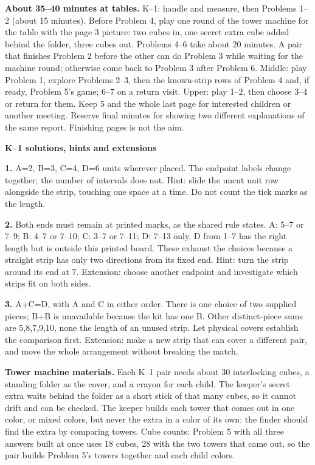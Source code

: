 \documentclass[letterpaper,11pt]{article}
\newcommand{\topic}[1]{\par\medskip\textbf{#1}\par}
\begin{document}
\textbf{About 35--40 minutes at tables.} K--1: handle and measure, then Problems 1--2 (about 15 minutes). Before Problem 4, play one round of the tower machine for the table with the page 3 picture: two cubes in, one secret extra cube added behind the folder, three cubes out. Problems 4--6 take about 20 minutes. A pair that finishes Problem 2 before the other can do Problem 3 while waiting for the machine round; otherwise come back to Problem 3 after Problem 6. Middle: play Problem 1, explore Problems 2--3, then the known-strip rows of Problem 4 and, if ready, Problem 5's game; 6--7 on a return visit. Upper: play 1--2, then choose 3--4 or return for them. Keep 5 and the whole last page for interested children or another meeting. Reserve final minutes for showing two different explanations of the same report. Finishing pages is not the aim.

\newpage
\topic{K--1 solutions, hints and extensions}
\textbf{1.} A=2, B=3, C=4, D=6 units wherever placed. The endpoint labels change together; the number of intervals does not. Hint: slide the uncut unit row alongside the strip, touching one space at a time. Do not count the tick marks as the length.

\textbf{2.} Both ends must remain at printed marks, as the shared rule states. A: 5--7 or 7--9; B: 4--7 or 7--10; C: 3--7 or 7--11; D: 7--13 only. D from 1--7 has the right length but is outside this printed board. These exhaust the choices because a straight strip has only two directions from its fixed end. Hint: turn the strip around its end at 7. Extension: choose another endpoint and investigate which strips fit on both sides.

\textbf{3.} A+C=D, with A and C in either order. There is one choice of two supplied pieces; B+B is unavailable because the kit has one B. Other distinct-piece sums are 5,8,7,9,10, none the length of an unused strip. Let physical covers establish the comparison first. Extension: make a new strip that can cover a different pair, and move the whole arrangement without breaking the match.

\textbf{Tower machine materials.} Each K--1 pair needs about 30 interlocking cubes, a standing folder as the cover, and a crayon for each child. The keeper's secret extra waits behind the folder as a short stick of that many cubes, so it cannot drift and can be checked. The keeper builds each tower that comes out in one color, or mixed colors, but never the extra in a color of its own: the finder should find the extra by comparing towers. Cube counts: Problem 5 with all three answers built at once uses 18 cubes, 28 with the two towers that came out, so the pair builds Problem 5's towers together and each child colors.
\end{document}
